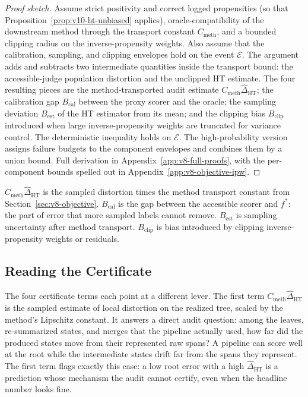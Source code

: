 \begin{proof}[Proof sketch]
Assume strict positivity and correct logged propensities (so that
Proposition~\ref{prop:v10-ht-unbiased} applies),
oracle-compatibility of the downstream method through the transport
constant \(C_{\mathrm{meth}}\), and a bounded clipping radius on
the inverse-propensity weights. Also assume that the calibration,
sampling, and clipping envelopes hold on the event \(\mathcal E\).
The argument adds and subtracts two intermediate quantities inside
the transport bound: the accessible-judge population distortion and
the unclipped HT estimate. The four resulting pieces are the
method-transported audit estimate
\(C_{\mathrm{meth}}\widehat\Delta_{\mathrm{HT}}\); the calibration
gap \(B_{\mathrm{cal}}\) between the proxy scorer and the oracle;
the sampling deviation \(B_{\mathrm{est}}\) of the HT estimator from
its mean; and the clipping bias \(B_{\mathrm{clip}}\) introduced
when large inverse-propensity weights are truncated for variance
control. The deterministic inequality holds on \(\mathcal E\). The
high-probability version assigns failure budgets to the component
envelopes and combines them by a union bound. Full derivation in
Appendix~\ref{app:v8-full-proofs}, with the per-component bounds
spelled out in Appendix~\ref{app:v8-objective-ipw}.
\end{proof}

\(C_{\mathrm{meth}}\widehat{\Delta}_{\mathrm{HT}}\) is the sampled
distortion times the method transport constant from
Section~\ref{sec:v8-objective}. \(B_{\mathrm{cal}}\) is the gap
between the accessible scorer and \(f^\ast\): the part of error that
more sampled labels cannot remove. \(B_{\mathrm{est}}\) is sampling
uncertainty after method transport. \(B_{\mathrm{clip}}\) is bias
introduced by clipping inverse-propensity weights or residuals.

\subsection{Reading the Certificate}

The four certificate terms each point at a different lever. The
first term \(C_{\mathrm{meth}}\widehat\Delta_{\mathrm{HT}}\) is the
sampled estimate of local distortion on the realized tree, scaled
by the method's Lipschitz constant. It answers a direct audit
question: among the leaves, re-summarized states, and merges that
the pipeline actually used, how far did the produced states move
from their represented raw spans? A pipeline can score well at the
root while the intermediate states drift far from the spans they
represent. The first term flags exactly this case: a low root error
with a high \(\widehat{\Delta}_{\mathrm{HT}}\) is a prediction
whose mechanism the audit cannot certify, even when the headline
number looks fine.

